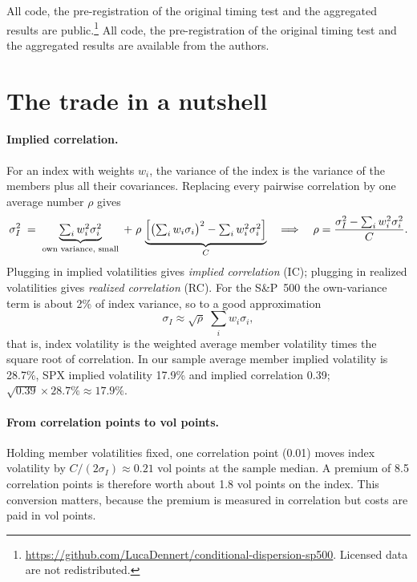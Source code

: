 \ifrepolink
All code, the pre-registration of the original timing test and the aggregated results are public.\footnote{\url{https://github.com/LucaDennert/conditional-dispersion-sp500}. Licensed data are not redistributed.}
\else
All code, the pre-registration of the original timing test and the aggregated results are available from the authors.
\fi

\section{The trade in a nutshell}\label{sec:nutshell}

\paragraph{Implied correlation.} For an index with weights $w_i$, the variance of the index is the variance of the members plus all their covariances. Replacing every pairwise correlation by one average number $\rho$ gives
\begin{equation}\label{eq:avgcorr}
  \sigma_I^2 \;=\; \underbrace{\textstyle\sum_i w_i^2\sigma_i^2}_{\text{own variance, small}} \;+\; \rho\,\underbrace{\Bigl[\bigl(\textstyle\sum_i w_i\sigma_i\bigr)^2 - \textstyle\sum_i w_i^2\sigma_i^2\Bigr]}_{C}
  \quad\Longrightarrow\quad
  \rho = \frac{\sigma_I^2 - \sum_i w_i^2\sigma_i^2}{C}.
\end{equation}
Plugging in implied volatilities gives \emph{implied correlation} (IC); plugging in realized volatilities gives \emph{realized correlation} (RC). For the S\&P~500 the own-variance term is about 2\% of index variance, so to a good approximation
\begin{equation}\label{eq:rule}
  \sigma_I \approx \sqrt{\rho}\;\textstyle\sum_i w_i \sigma_i ,
\end{equation}
that is, index volatility is the weighted average member volatility times the square root of correlation. In our sample average member implied volatility is 28.7\%, SPX implied volatility 17.9\% and implied correlation 0.39; $\sqrt{0.39}\times 28.7\% \approx 17.9\%$.

\paragraph{From correlation points to vol points.} Holding member volatilities fixed, one correlation point (0.01) moves index volatility by $C/(2\sigma_I) \approx 0.21$ vol points at the sample median. A premium of 8.5 correlation points is therefore worth about 1.8 vol points on the index. This conversion matters, because the premium is measured in correlation but costs are paid in vol points.

